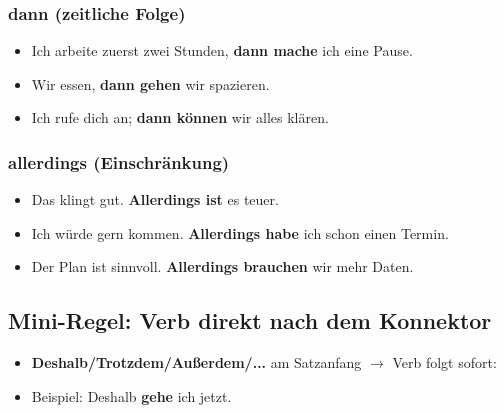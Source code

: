 \documentclass[a4paper,12pt]{article}
\begin{document}
            \subsubsection{dann (zeitliche Folge)}
            \begin{itemize}[leftmargin=2em]
					\item Ich arbeite zuerst zwei Stunden, \textbf{dann mache} ich eine Pause.
                    \item Wir essen, \textbf{dann gehen} wir spazieren.
                    \item Ich rufe dich an; \textbf{dann k\"onnen} wir alles kl\"aren.
                \end{itemize}
            
            \subsubsection{allerdings (Einschr\"ankung)}
            \begin{itemize}[leftmargin=2em]
					\item Das klingt gut. \textbf{Allerdings ist} es teuer.
                    \item Ich w\"urde gern kommen. \textbf{Allerdings habe} ich schon einen Termin.
                    \item Der Plan ist sinnvoll. \textbf{Allerdings brauchen} wir mehr Daten.
                \end{itemize}
        
        \subsection{Mini-Regel: Verb direkt nach dem Konnektor}
            \begin{itemize}[leftmargin=2em]
				\item \textbf{Deshalb/Trotzdem/Au\ss erdem/...} am Satzanfang \(\rightarrow\) Verb folgt sofort:
                \item Beispiel: Deshalb \textbf{gehe} ich jetzt.
            \end{itemize}
    
    
\end{document}
